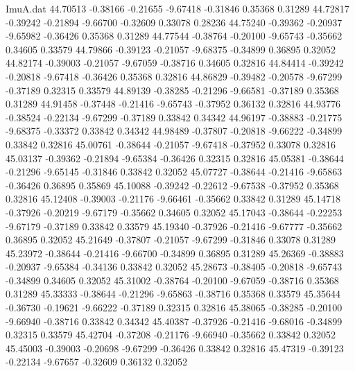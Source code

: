 \begin{filecontents}{ImuA.dat}
  44.70513   -0.38166   -0.21655   -9.67418   -0.31846    0.35368    0.31289
  44.72817   -0.39242   -0.21894   -9.66700   -0.32609    0.33078    0.28236
  44.75240   -0.39362   -0.20937   -9.65982   -0.36426    0.35368    0.31289
  44.77544   -0.38764   -0.20100   -9.65743   -0.35662    0.34605    0.33579
  44.79866   -0.39123   -0.21057   -9.68375   -0.34899    0.36895    0.32052
  44.82174   -0.39003   -0.21057   -9.67059   -0.38716    0.34605    0.32816
  44.84414   -0.39242   -0.20818   -9.67418   -0.36426    0.35368    0.32816
  44.86829   -0.39482   -0.20578   -9.67299   -0.37189    0.32315    0.33579
  44.89139   -0.38285   -0.21296   -9.66581   -0.37189    0.35368    0.31289
  44.91458   -0.37448   -0.21416   -9.65743   -0.37952    0.36132    0.32816
  44.93776   -0.38524   -0.22134   -9.67299   -0.37189    0.33842    0.34342
  44.96197   -0.38883   -0.21775   -9.68375   -0.33372    0.33842    0.34342
  44.98489   -0.37807   -0.20818   -9.66222   -0.34899    0.33842    0.32816
  45.00761   -0.38644   -0.21057   -9.67418   -0.37952    0.33078    0.32816
  45.03137   -0.39362   -0.21894   -9.65384   -0.36426    0.32315    0.32816
  45.05381   -0.38644   -0.21296   -9.65145   -0.31846    0.33842    0.32052
  45.07727   -0.38644   -0.21416   -9.65863   -0.36426    0.36895    0.35869
  45.10088   -0.39242   -0.22612   -9.67538   -0.37952    0.35368    0.32816
  45.12408   -0.39003   -0.21176   -9.66461   -0.35662    0.33842    0.31289
  45.14718   -0.37926   -0.20219   -9.67179   -0.35662    0.34605    0.32052
  45.17043   -0.38644   -0.22253   -9.67179   -0.37189    0.33842    0.33579
  45.19340   -0.37926   -0.21416   -9.67777   -0.35662    0.36895    0.32052
  45.21649   -0.37807   -0.21057   -9.67299   -0.31846    0.33078    0.31289
  45.23972   -0.38644   -0.21416   -9.66700   -0.34899    0.36895    0.31289
  45.26369   -0.38883   -0.20937   -9.65384   -0.34136    0.33842    0.32052
  45.28673   -0.38405   -0.20818   -9.65743   -0.34899    0.34605    0.32052
  45.31002   -0.38764   -0.20100   -9.67059   -0.38716    0.35368    0.31289
  45.33333   -0.38644   -0.21296   -9.65863   -0.38716    0.35368    0.33579
  45.35644   -0.36730   -0.19621   -9.66222   -0.37189    0.32315    0.32816
  45.38065   -0.38285   -0.20100   -9.66940   -0.38716    0.33842    0.34342
  45.40387   -0.37926   -0.21416   -9.68016   -0.34899    0.32315    0.33579
  45.42704   -0.37208   -0.21176   -9.66940   -0.35662    0.33842    0.32052
  45.45003   -0.39003   -0.20698   -9.67299   -0.36426    0.33842    0.32816
  45.47319   -0.39123   -0.22134   -9.67657   -0.32609    0.36132    0.32052

\end{filecontents}

